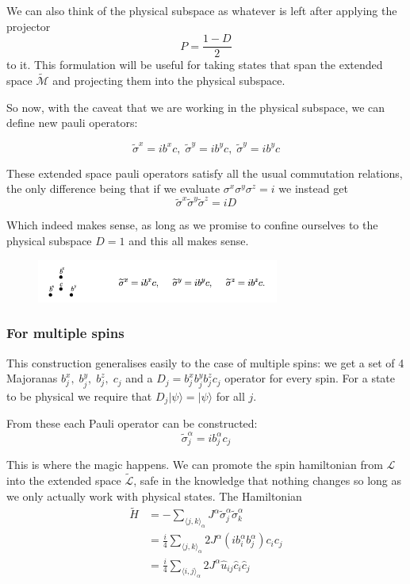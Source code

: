 We can also think of the physical subspace as whatever is left after
applying the projector \[P  = \frac{1 - D}{2}\] to it. This formulation
will be useful for taking states that span the extended space
\(\mathcal{\tilde{M}}\) and projecting them into the physical subspace.

So now, with the caveat that we are working in the physical subspace, we
can define new pauli operators:

\[\tilde{\sigma}^x = i b^x c,\; \tilde{\sigma}^y = i b^y c,\; \tilde{\sigma}^y = i b^y c\]

These extended space pauli operators satisfy all the usual commutation
relations, the only difference being that if we evaluate
\(\sigma^x \sigma^y \sigma^z = i\) we instead get
\[ \tilde{\sigma}^x\tilde{\sigma}^y\tilde{\sigma}^z = iD \]

Which indeed makes sense, as long as we promise to confine ourselves to
the physical subspace \(D = 1\) and this all makes sense.

\begin{figure}
\hypertarget{fig:majorana}{%
\centering
\includegraphics[width=0.71\textwidth,height=\textheight]{figure_code/majorana.png}
\caption{}\label{fig:majorana}
}
\end{figure}

\hypertarget{for-multiple-spins}{%
\subsubsection{For multiple spins}\label{for-multiple-spins}}

This construction generalises easily to the case of multiple spins: we
get a set of 4 Majoranas \(b^x_j,\; b^y_j,\;b^z_j,\; c_j\) and a
\(D_j = b^x_jb^y_jb^z_jc_j\) operator for every spin. For a state to be
physical we require that \(D_j |\psi\rangle = |\psi\rangle\) for all
\(j\).

From these each Pauli operator can be constructed:
\[\tilde{\sigma}^\alpha_j = i b^\alpha_j c_j\]

This is where the magic happens. We can promote the spin hamiltonian
from \(\mathcal{L}\) into the extended space \(\mathcal{\tilde{L}}\),
safe in the knowledge that nothing changes so long as we only actually
work with physical states. The Hamiltonian \[\begin{aligned}
\tilde{H} &=  - \sum_{\langle j,k\rangle_\alpha} J^{\alpha}\tilde{\sigma}_j^{\alpha}\tilde{\sigma}_k^{\alpha}\\
          &= \frac{i}{4} \sum_{\langle j,k\rangle_\alpha} 2J^{\alpha} (ib^\alpha_i b^\alpha_j) c_i c_j\\
          &=  \frac{i}{4} \sum_{\langle i,j\rangle_\alpha} 2J^{\alpha} \hat{u}_{ij} \hat{c}_i \hat{c}_j
\end{aligned}\]

